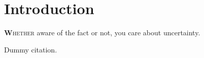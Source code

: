 \documentclass[../primer.tex]{subfiles}
\begin{document}
\chapter{Introduction}
\lettrine[findent=2pt]{\textbf{W}}{hether} aware of the fact or not, you care
about uncertainty.

Dummy citation.\cite{shvartsman2016}
\end{document}
